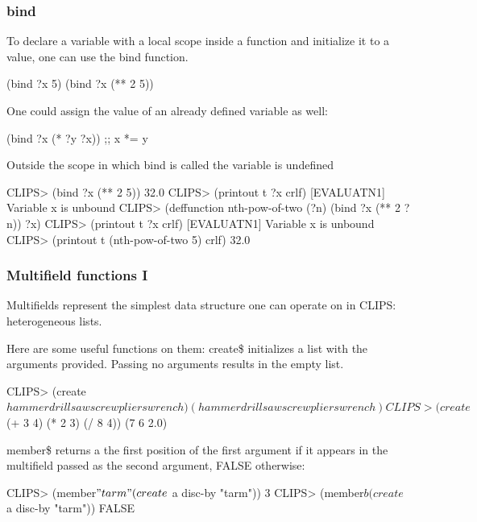 \documentclass[xcolor={usenames,dvipsnames,svgnames}, compress]{beamer}
\begin{document}
\begin{frame}[fragile]
  \frametitle{bind}
  To declare a variable with a local scope inside a function and
  initialize it to a value, one can use the \textsf{bind} function.
  \begin{clips-code}[numbers=none]
    (bind ?x 5)    (bind ?x (** 2 5))
  \end{clips-code}
  One could assign the value of an already defined variable as well:
  \begin{clips-code}[numbers=none]
    (bind ?x (* ?y ?x)) ;; x *= y
  \end{clips-code}
  Outside the scope in which bind is called the variable is undefined
  \begin{clips-code}
    CLIPS> (bind ?x (** 2 5))
    32.0
    CLIPS> (printout t ?x crlf)
    [EVALUATN1] Variable x is unbound
    CLIPS> (deffunction nth-pow-of-two (?n) (bind ?x (** 2 ?n)) ?x)
    CLIPS> (printout t ?x crlf)
    [EVALUATN1] Variable x is unbound
    CLIPS> (printout t (nth-pow-of-two 5) crlf)
    32.0
  \end{clips-code}
\end{frame}

\begin{frame}[fragile]
  \frametitle{Multifield functions I}
  Multifields represent the simplest data structure one can operate on
  in CLIPS: heterogeneous lists.\par
  Here are some useful functions on them:
  \textsf{create\$} initializes a list with the arguments provided.
  Passing no arguments results in the empty list.
  \begin{clips-code}
    CLIPS> (create$ hammer drill saw screw pliers wrench)
    (hammer drill saw screw pliers wrench)
    CLIPS> (create$ (+ 3 4) (* 2 3) (/ 8 4))
    (7 6 2.0)
  \end{clips-code}\bigskip
  
  \textsf{member\$} returns a the first position of the
  first argument if it appears in the multifield passed as the second
  argument, FALSE otherwise:
  \begin{clips-code}
    CLIPS> (member$ "tarm" (create$ a disc-by "tarm")) 
    3
    CLIPS> (member$ b (create$ a disc-by "tarm")) 
    FALSE
  \end{clips-code}
\end{frame}


\end{document}
